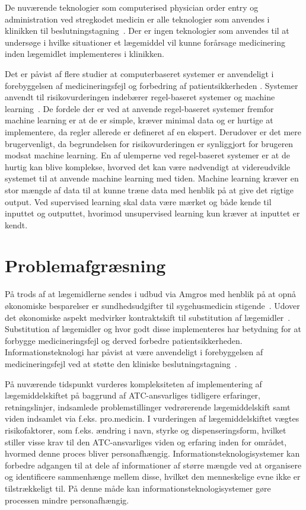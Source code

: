 De nuværende teknologier som computerised physician order entry og administration ved stregkodet medicin er alle teknologier som anvendes i klinikken til beslutningstagning~\citep{Agrawal2009, Bates2000a, Kaushal2002, Stenner2010, Fischer2008, Simpson2008}. Der er ingen teknologier som anvendes til at undersøge i hvilke situationer et lægemiddel vil kunne forårsage medicinering inden lægemidlet implementeres i klinikken.

Det er påvist af flere studier at computerbaseret systemer er anvendeligt i forebyggelsen af medicineringsfejl og forbedring af patientsikkerheden \citep{Agrawal2009, Masys2006}. Systemer anvendt til risikovurderingen indebærer regel-baseret systemer og machine learning~\citep{Geissert2018}. 
De fordele der er ved at anvende regel-baseret systemer fremfor machine learning er at de er simple, kræver minimal data og er hurtige at implementere, da regler allerede er defineret af en ekspert. Derudover er det mere brugervenligt, da begrundelsen  for risikovurderingen er synliggjort for brugeren modsat machine learning. En af ulemperne ved regel-baseret systemer er at de hurtig kan  blive komplekse, hvorved det kan være nødvendigt at videreudvikle systemet til at anvende machine learning med tiden. Machine learning kræver en stor mængde af data til at kunne træne data med henblik på at give det rigtige output. Ved supervised learning skal data være mærket og både kende til inputtet og outputtet, hvorimod unsupervised learning kun kræver at inputtet er kendt. 

\section{Problemafgræsning}
På trods af at lægemidlerne sendes i udbud via Amgros med henblik på at opnå økonomiske besparelser er sundhedsudgifter til sygehusmedicin stigende~\citep{Sundhed2016,Sygehusapoteket2017}. Udover det økonomiske aspekt medvirker kontraktskift til substitution af lægemidler~\citep{DanskSelskabforPatientsikkerhed2009}. Substitution af lægemidler og hvor godt disse implementeres har betydning for at forbygge medicineringsfejl og derved forbedre patientsikkerheden. Informationsteknologi har påvist at være anvendeligt i forebyggelsen af medicineringsfejl ved at støtte den kliniske beslutningstagning~\citep{Agrawal2009, Anderson2002}. 

På nuværende tidspunkt vurderes kompleksiteten af implementering af lægemiddelskiftet på baggrund af ATC-ansvarliges tidligere erfaringer, retningslinjer, indsamlede problemstillinger vedrørerende lægemiddelskift samt viden indsamlet via f.eks. pro.medicin. I vurderingen af lægemiddelskiftet vægtes risikofaktorer, som f.eks. ændring i navn, styrke og dispenseringsform, hvilket stiller visse krav til den ATC-ansvarliges viden og erfaring inden for området, hvormed denne proces bliver personafhængig. Informationsteknologisystemer kan forbedre adgangen til at dele af informationer af større mængde ved at organisere og identificere sammenhænge mellem disse, hvilket den menneskelige evne ikke er tilstrækkeligt til. På denne måde kan informationsteknologisystemer gøre processen mindre personafhængig. 

